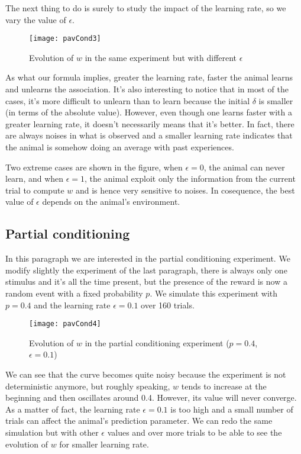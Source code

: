 The next thing to do is surely to
study the impact of the learning rate, so we vary the value of $\epsilon$.

\vspace{-1em}
\begin{figure}[H]
  \centering
  \texttt{[image: pavCond3]}
  \caption
    {Evolution of $w$ in the same experiment but with different $\epsilon$}
\end{figure}

As what our formula implies, greater the learning rate, faster the animal
learns and unlearns the association. It's also interesting to notice that in
most of the cases, it's more difficult to unlearn than to learn because the
initial $\delta$ is smaller (in terms of the absolute value). However, even 
though one learns faster with a greater learning rate, it doesn't necessarily 
means that it's better. In fact, there are always noises in what is observed 
and a smaller learning rate indicates that the animal is somehow doing an 
average with past experiences. 

Two extreme cases are shown in the figure, when $\epsilon = 0$, the animal can
never learn, and when $\epsilon = 1$, the animal exploit only the information
from the current trial to compute $w$ and is hence very sensitive to noises.
In cosequence, the best value of $\epsilon$ depends on the animal's 
environment.

\subsection{Partial conditioning}

In this paragraph we are interested in the partial conditioning experiment. We
modify slightly the experiment of the last paragraph, there is always only one
stimulus and it's all the time present, but the presence of the reward is now a
random event with a fixed probability $p$. We simulate this experiment with 
$p = 0.4$ and the learning rate $\epsilon = 0.1$ over 160 trials.

\vspace{-1em}
\begin{figure}[H]
  \centering
  \texttt{[image: pavCond4]}
  \caption {Evolution of $w$ in the partial conditioning experiment 
            ($p = 0.4$, $\epsilon = 0.1$)}
\end{figure}

We can see that the curve becomes quite noisy because the experiment is not
deterministic anymore, but roughly speaking, $w$ tends to increase at the
beginning and then oscillates around 0.4. However, its value will never
converge. As a matter of fact, the learning rate $\epsilon = 0.1$ is too high
and a small number of trials can affect the animal's prediction parameter. 
We can redo the same simulation but with other $\epsilon$ values and over more
trials to be able to see the evolution of $w$ for smaller learning rate.

